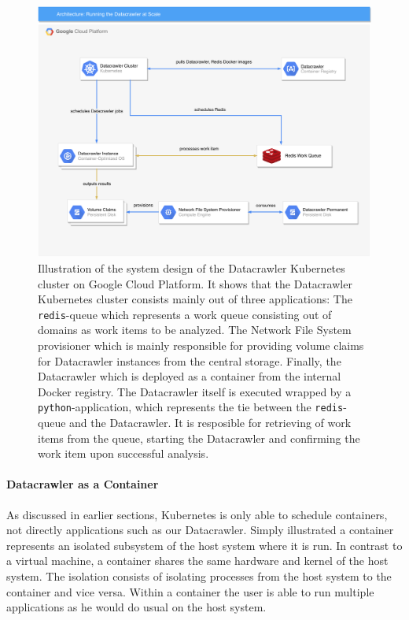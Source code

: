 \begin{figure}
	\centering
	\includegraphics[scale=0.5]{resources/datacrawler_k8s_architecture}
	\caption[System Design of "Running the Datacrawler at Scale"]{Illustration of the system design of the Datacrawler Kubernetes cluster on Google Cloud Platform. It shows that the Datacrawler Kubernetes cluster consists mainly out of three applications: The \texttt{redis}-queue which represents a work queue consisting out of domains as work items to be analyzed. The Network File System provisioner which is mainly responsible for providing volume claims for Datacrawler instances from the central storage. Finally, the Datacrawler which is deployed as a container from the internal Docker registry. The Datacrawler itself is executed wrapped by a \texttt{python}-application, which represents the tie between the \texttt{redis}-queue and the Datacrawler. It is resposible for retrieving of work items from the queue, starting the Datacrawler and confirming the work item upon successful analysis.}
	\label{datacrawler_k8s_architecture}
\end{figure}
\paragraph*{Datacrawler as a Container}
\label{datacrawler_container}

As discussed in earlier sections, Kubernetes is only able to schedule containers, not directly applications such as our Datacrawler. Simply illustrated a container represents an isolated subsystem of the host system where it is run. In contrast to a virtual machine, a container shares the same hardware and kernel of the host system. The isolation consists of isolating processes from the host system to the container and vice versa. Within a container the user is able to run multiple applications as he would do usual on the host system. 

